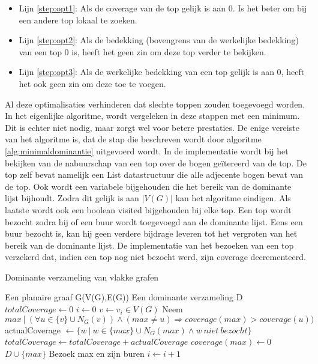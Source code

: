 \documentclass[11pt, a4paper, table]{article}
\makeatletter
\newenvironment{algoritme}[1][H]{%
	\renewcommand{\ALG@name}{Algoritme}%
	\renewcommand{\algorithmicrequire}{\textbf{Input:}}
	\renewcommand{\algorithmicensure}{\textbf{Output:}}
	\begin{algorithm}[#1]%
	}{\end{algorithm}}
\theoremstyle{definition}
\theoremstyle{definition}
\theoremstyle{definition}
\makeatother
\begin{document}
\begin{itemize}
	\item Lijn \ref{step:opt1}: Als de coverage van de top gelijk is aan 0. Is het beter om bij een andere top lokaal te zoeken. 
	\item Lijn \ref{step:opt2}: Als de bedekking (bovengrens van de werkelijke bedekking) van een top 0 is, heeft het geen zin om deze top verder te bekijken. 
	\item Lijn \ref{step:opt3}: Als de werkelijke bedekking van een top gelijk is aan 0, heeft het ook geen zin om deze toe te voegen. 
\end{itemize}
Al deze optimalisaties verhinderen dat slechte toppen zouden toegevoegd worden. In het eigenlijke algoritme, wordt vergeleken in deze stappen met een minimum. Dit is echter niet nodig, maar zorgt wel voor betere prestaties. De enige vereiste van het algoritme is, dat de stap die beschreven wordt door algoritme \ref{alg:minimaldominantie} uitgevoerd wordt. In de implementatie wordt bij het bekijken van de nabuurschap van een top over de bogen ge\"{i}tereerd van de top. De top zelf bevat namelijk een List datastructuur die alle adjecente bogen bevat van de top. Ook wordt een variabele bijgehouden die het bereik van de dominante lijst bijhoudt. Zodra dit gelijk is aan $|V(G)|$ kan het algoritme eindigen. Als laatste wordt ook een boolean visited bijgehouden bij elke top. Een top wordt bezocht zodra hij of een buur wordt toegevoegd aan de dominante lijst. Eens een buur bezocht is, kan hij geen verdere bijdrage leveren tot het vergroten van het bereik van de dominante lijst. De implementatie van het bezoeken van een top verzekerd dat, indien een top nog niet bezocht werd, zijn coverage decrementeerd. 
\begin{tcolorbox}[blanker,float=btp, grow to left by=2cm,grow to right by=2cm]
	\begin{algoritme}
		\caption{Dominante verzameling van vlakke grafen}
		\begin{algorithmic}
			\Require Een planaire graaf G(V(G),E(G))
			\Ensure Een dominante verzameling D
			\State $totalCoverage \gets 0$
			\State $ i \gets 0$
			\State $v \gets v_i \in V(G)$
			\label{step:opt1}
			\State Neem $max\ |\ (\forall u \in \{v\} \cup N_G(v)) \land (max \ne u) \Rightarrow coverage(max)>coverage(u))$
			\label{step:opt2}
			\State actualCoverage $\gets \{w\ |\ w  \in \{max\} \cup N_G(max) \land w\ niet \  bezocht\}$
			\label{step:opt3}
			\State $totalCoverage \gets totalCoverage + actualCoverage$
			\State $coverage(max)  \gets 0$
			\State $ D \cup \{max\}$
			\State Bezoek max en zijn buren
			\EndIf 
			\EndIf
			\EndIf
			\State $i \gets i+1$
			\EndWhile		
		\end{algorithmic}
		\label{alg:minimaldominantie}
	\end{algoritme}
\end{tcolorbox}
\FloatBarrier
\end{document}
